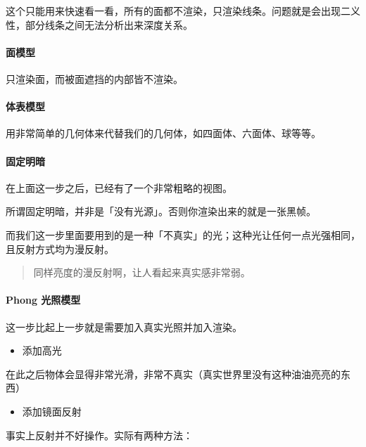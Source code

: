 \documentclass[
]{article}
\begin{document}
这个只能用来快速看一看，所有的面都不渲染，只渲染线条。问题就是会出现二义性，部分线条之间无法分析出来深度关系。

\hypertarget{header-n206}{%
\paragraph{面模型}\label{header-n206}}

只渲染面，而被面遮挡的内部皆不渲染。

\hypertarget{header-n208}{%
\paragraph{体表模型}\label{header-n208}}

用非常简单的几何体来代替我们的几何体，如四面体、六面体、球等等。

\hypertarget{header-n210}{%
\paragraph{固定明暗}\label{header-n210}}

在上面这一步之后，已经有了一个非常粗略的视图。

所谓固定明暗，并非是「没有光源」。否则你渲染出来的就是一张黑帧。

而我们这一步里面要用到的是一种「不真实」的光；这种光让任何一点光强相同，且反射方式均为漫反射。

\begin{quote}
同样亮度的漫反射啊，让人看起来真实感非常弱。
\end{quote}

\hypertarget{header-n216}{%
\paragraph{Phong 光照模型}\label{header-n216}}

这一步比起上一步就是需要加入真实光照并加入渲染。

\begin{itemize}
\item
  添加高光
\end{itemize}

在此之后物体会显得非常光滑，非常不真实（真实世界里没有这种油油亮亮的东西）

\begin{itemize}
\item
  添加镜面反射
\end{itemize}

事实上反射并不好操作。实际有两种方法：
\end{document}
